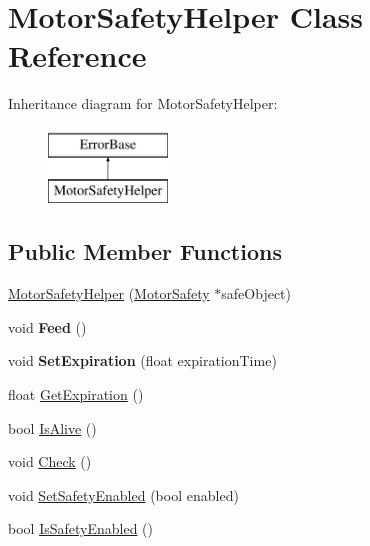 \hypertarget{classMotorSafetyHelper}{
\section{MotorSafetyHelper Class Reference}
\label{classMotorSafetyHelper}
}
Inheritance diagram for MotorSafetyHelper:\begin{figure}[H]
\begin{center}
\leavevmode
\includegraphics[height=2.000000cm]{classMotorSafetyHelper}
\end{center}
\end{figure}
\subsection*{Public Member Functions}
\begin{DoxyCompactItemize}
\item 
\hyperlink{classMotorSafetyHelper_ad125be744ff4ee41557c3bfedcfc8d8f}{MotorSafetyHelper} (\hyperlink{classMotorSafety}{MotorSafety} $\ast$safeObject)
\item 
\hypertarget{classMotorSafetyHelper_a67b80e9817dc725e0678de5e8f0bb39e}{
void {\bfseries Feed} ()}
\label{classMotorSafetyHelper_a67b80e9817dc725e0678de5e8f0bb39e}

\item 
\hypertarget{classMotorSafetyHelper_a7b41cb1bf51aa167d97a82691ac94f81}{
void {\bfseries SetExpiration} (float expirationTime)}
\label{classMotorSafetyHelper_a7b41cb1bf51aa167d97a82691ac94f81}

\item 
float \hyperlink{classMotorSafetyHelper_abd3c09d75c252406d43deed9e83234f5}{GetExpiration} ()
\item 
bool \hyperlink{classMotorSafetyHelper_a3d4d90d4f7bc0d76445a55e5ea1d75e8}{IsAlive} ()
\item 
void \hyperlink{classMotorSafetyHelper_a951390af947b507a299d1175b7e717cf}{Check} ()
\item 
void \hyperlink{classMotorSafetyHelper_ad3904b781b0d4e88aba0e9a93995b122}{SetSafetyEnabled} (bool enabled)
\item 
bool \hyperlink{classMotorSafetyHelper_af038daa6b107e8b4ef604497d451ce07}{IsSafetyEnabled} ()
\end{DoxyCompactItemize}
